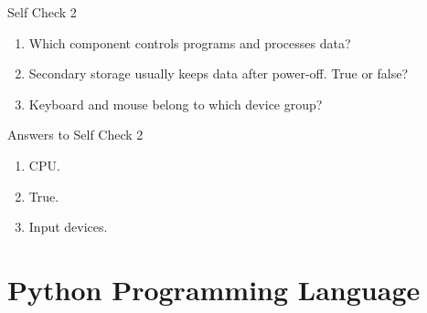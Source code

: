 \documentclass[aspectratio=169,10pt]{beamer}
\begin{document}
\begin{frame}{Self Check 2}
\begin{enumerate}
  \item Which component controls programs and processes data?
  \item Secondary storage usually keeps data after power-off. True or false?
  \item Keyboard and mouse belong to which device group?
\end{enumerate}
\end{frame}

\begin{frame}{Answers to Self Check 2}
\begin{enumerate}
  \item CPU.
  \item True.
  \item Input devices.
\end{enumerate}
\end{frame}

\section{Python Programming Language}
\end{document}
